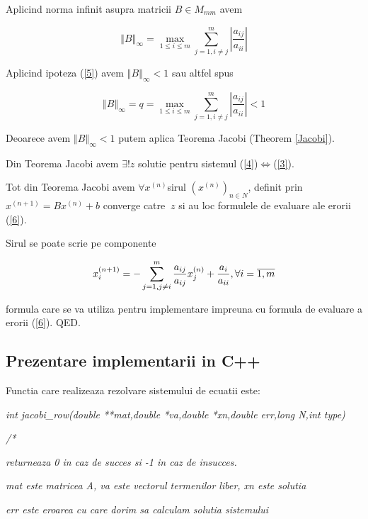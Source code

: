 \documentclass[a4paper,twoside]{book}
\begin{document}
Aplicind norma infinit asupra matricii $B\in M_{mm}$ avem

\begin{equation*}
\left\Vert B\right\Vert _{\infty }=\max_{1\leq i\leq m}\sum_{j=1,i\neq
j}^{m}\left\vert \frac{a_{ij}}{a_{ii}}\right\vert
\end{equation*}

Aplicind ipoteza (\ref{5}) avem $\left\Vert B\right\Vert _{\infty }<1$ sau
altfel spus

\begin{equation*}
\left\Vert B\right\Vert _{\infty }=q=\max_{1\leq i\leq m}\sum_{j=1,i\neq
j}^{m}\left\vert \frac{a_{ij}}{a_{ii}}\right\vert <1
\end{equation*}

Deoarece avem $\left\Vert B\right\Vert _{\infty }<1$ putem aplica Teorema
Jacobi (Theorem \ref{Jacobi}).

Din Teorema Jacobi avem $\exists !z$ solutie pentru sistemul (\ref{4})$%
\Leftrightarrow $(\ref{3}).

Tot din Teorema Jacobi avem $\forall x^{(n)}$sirul $(x^{(n)})_{n\in N}$,
definit prin $x^{(n+1)}=Bx^{(n)}+b$ converge catre $\ z$ si au loc formulele
de evaluare ale erorii (\ref{6}).

Sirul se poate scrie pe componente

\begin{equation}
x_{i}^{(n+1)}=-\sum_{j=1,j\neq i}^{m}\frac{a_{ij}}{a_{ij}}x_{j}^{(n)}+\frac{%
a_{i}}{a_{ii}},\forall i=\overline{1,m}  \label{Jacobi-Row}
\end{equation}

formula care se va utiliza pentru implementare impreuna cu formula de
evaluare a erorii (\ref{6}). QED.

\subsection{Prezentare implementarii in C++}

\bigskip Functia care realizeaza rezolvare sistemului de ecuatii este:

\textit{int jacobi\_row(double **mat,double *va,double *xn,double err,long
N,int type)}

\textit{/*}

\textit{\qquad returneaza 0 in caz de succes si -1 in caz de insucces.}

\textit{\qquad mat este matricea A, va este vectorul termenilor liber, xn
este solutia}

\textit{\qquad err este eroarea cu care dorim sa calculam solutia sistemului}
\end{document}
